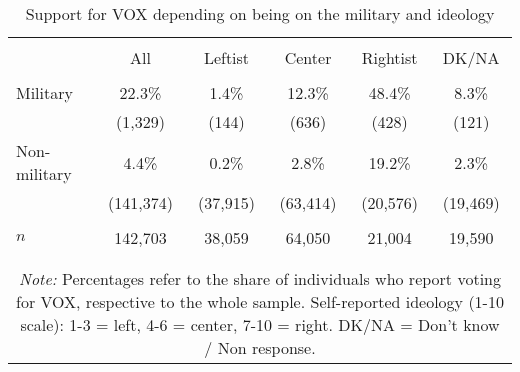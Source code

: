 \begin{table}[!htbp] \centering
\caption{Support for VOX depending on being on the military and ideology}
\label{tab:surveyfreq}
\small
\begin{tabular}{lccccc}
\\[-1.8ex]\hline
\hline \\[-1.8ex]
& All & Leftist & Center & Rightist & DK/NA \\
\cline{2-6} \\[-1.8ex]
Military & 22.3\% & 1.4\% & 12.3\% & 48.4\% & 8.3\% \\
 & (1,329) & (144) & (636) & (428) & (121) \\
Non-military & 4.4\% & 0.2\% & 2.8\% & 19.2\% & 2.3\% \\
 & (141,374) & (37,915) & (63,414) & (20,576) & (19,469) \\
\cline{2-6} \\[-1.8ex]
$n$ & 142,703 & 38,059 & 64,050 & 21,004 & 19,590 \\
\\[-1.8ex]\hline
\hline \\[-1.8ex]
\multicolumn{6}{c}{\parbox[t]{0.75\textwidth}{\textit{Note:} Percentages refer to the share of individuals who report voting for VOX, respective to the whole sample. Self-reported ideology (1-10 scale): 1-3 = left, 4-6 = center, 7-10 = right. DK/NA = Don't know / Non response.}}\\
\end{tabular}
\end{table}
